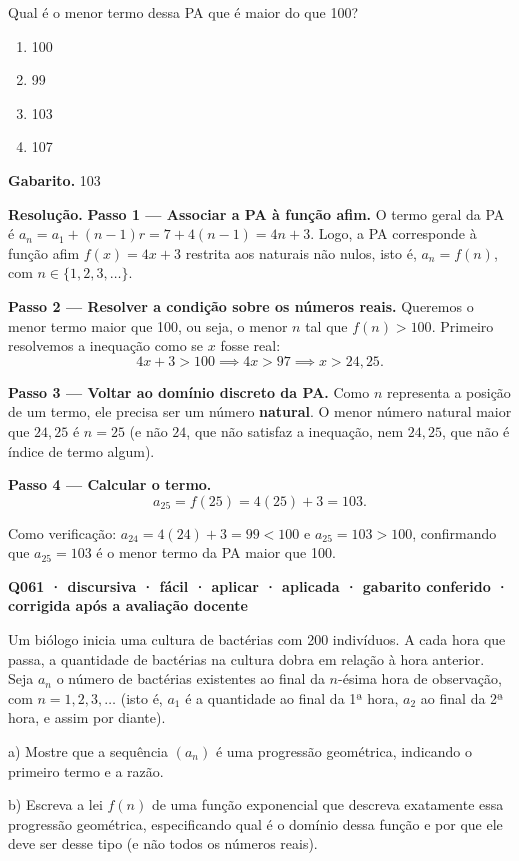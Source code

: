 Qual é o menor termo dessa PA que é maior do que 100?
\begin{enumerate}[label=(\alph*)]
\item 100
\item 99
\item 103
\item 107
\end{enumerate}

\textbf{Gabarito.} 103

\textbf{Resolução.} \textbf{Passo 1 — Associar a PA à função afim.}
O termo geral da PA é $a_n = a_1 + (n-1)r = 7 + 4(n-1) = 4n + 3$. Logo, a PA corresponde à função afim $f(x) = 4x+3$ restrita aos naturais não nulos, isto é, $a_n = f(n)$, com $n \in \{1, 2, 3, \dots\}$.

\textbf{Passo 2 — Resolver a condição sobre os números reais.}
Queremos o menor termo maior que 100, ou seja, o menor $n$ tal que $f(n) > 100$. Primeiro resolvemos a inequação como se $x$ fosse real:
$$4x + 3 > 100 \implies 4x > 97 \implies x > 24{,}25.$$

\textbf{Passo 3 — Voltar ao domínio discreto da PA.}
Como $n$ representa a posição de um termo, ele precisa ser um número \textbf{natural}. O menor número natural maior que $24{,}25$ é $n = 25$ (e não $24$, que não satisfaz a inequação, nem $24{,}25$, que não é índice de termo algum).

\textbf{Passo 4 — Calcular o termo.}
$$a_{25} = f(25) = 4(25) + 3 = 103.$$

Como verificação: $a_{24} = 4(24)+3 = 99 < 100$ e $a_{25} = 103 > 100$, confirmando que $a_{25}=103$ é o menor termo da PA maior que 100.

\bigskip\noindent\textbf{Q061 · discursiva · fácil · aplicar · aplicada · gabarito conferido · corrigida após a avaliação docente}\par\nopagebreak
Um biólogo inicia uma cultura de bactérias com 200 indivíduos. A cada hora que passa, a quantidade de bactérias na cultura dobra em relação à hora anterior. Seja $a_n$ o número de bactérias existentes ao final da $n$-ésima hora de observação, com $n = 1, 2, 3, \dots$ (isto é, $a_1$ é a quantidade ao final da 1ª hora, $a_2$ ao final da 2ª hora, e assim por diante).

a) Mostre que a sequência $(a_n)$ é uma progressão geométrica, indicando o primeiro termo e a razão.

b) Escreva a lei $f(n)$ de uma função exponencial que descreva exatamente essa progressão geométrica, especificando qual é o domínio dessa função e por que ele deve ser desse tipo (e não todos os números reais).

